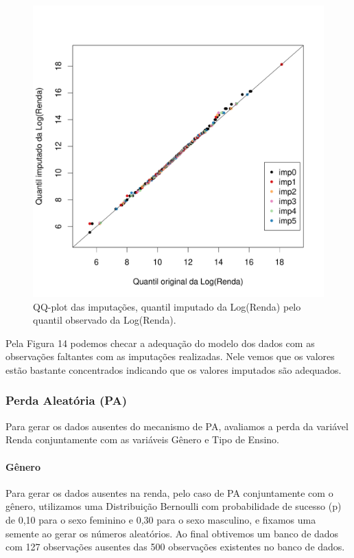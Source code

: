 \documentclass[]{article}
\let\oldparagraph\paragraph
\renewcommand{\paragraph}[1]{\oldparagraph{#1}\mbox{}}
\begin{document}
\begin{figure}[H]

{\centering \includegraphics[width=0.6\linewidth]{p43-graf} 

}

\caption{QQ-plot das imputações, quantil imputado da Log(Renda) pelo quantil observado da Log(Renda).}\label{fig:unnamed-chunk-22}
\end{figure}

Pela Figura 14 podemos checar a adequação do modelo dos dados com as
observações faltantes com as imputações realizadas. Nele vemos que os
valores estão bastante concentrados indicando que os valores imputados
são adequados.

\subsubsection{Perda Aleatória (PA)}\label{perda-aleatoria-pa}

Para gerar os dados ausentes do mecanismo de PA, avaliamos a perda da
variável Renda conjuntamente com as variáveis Gênero e Tipo de Ensino.

\paragraph{Gênero}\label{genero}

Para gerar os dados ausentes na renda, pelo caso de PA conjuntamente com
o gênero, utilizamos uma Distribuição Bernoulli com probabilidade de
sucesso (p) de 0,10 para o sexo feminino e 0,30 para o sexo masculino, e
fixamos uma semente ao gerar os números aleatórios. Ao final obtivemos
um banco de dados com 127 observações ausentes das 500 observações
existentes no banco de dados.
\end{document}
